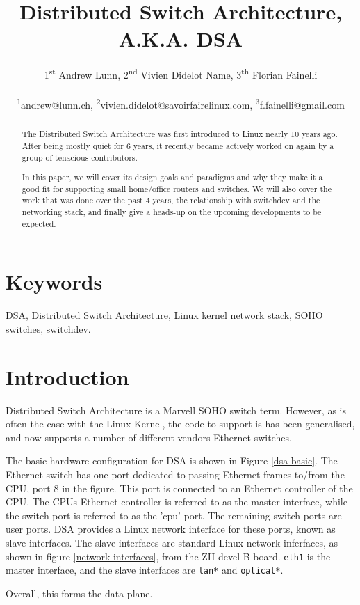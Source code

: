 \documentclass[letterpaper]{article}
\title{Distributed Switch Architecture,\\ A.K.A. DSA}
\author{1\textsuperscript{st} Andrew Lunn, 2\textsuperscript{nd} Vivien Didelot Name,  3\textsuperscript{th} Florian Fainelli\\
  \\
  \textsuperscript{1}andrew@lunn.ch,
  \textsuperscript{2}vivien.didelot@savoirfairelinux.com,
  \textsuperscript{3}f.fainelli@gmail.com\\
}
\begin{document}
\maketitle
\begin{abstract}

  The Distributed Switch Architecture was first introduced to Linux
  nearly 10 years ago. After being mostly quiet for 6 years, it
  recently became actively worked on again by a group of tenacious
  contributors.

  In this paper, we will cover its design goals and paradigms and why
  they make it a good fit for supporting small home/office routers and
  switches. We will also cover the work that was done over the past 4
  years, the relationship with switchdev and the networking stack, and
  finally give a heads-up on the upcoming developments to be expected.
\end{abstract}

\section{Keywords}

DSA, Distributed Switch Architecture, Linux kernel network stack, SOHO
switches, switchdev.

\section{Introduction}

Distributed Switch Architecture is a Marvell SOHO switch
term. However, as is often the case with the Linux Kernel, the code to
support is has been generalised, and now supports a number of
different vendors Ethernet switches.

The basic hardware configuration for DSA is shown in Figure
\ref{dsa-basic}. The Ethernet switch has one port dedicated to passing
Ethernet frames to/from the CPU, port 8 in the figure. This port is
connected to an Ethernet controller of the CPU. The CPUs Ethernet
controller is referred to as the master interface, while the switch
port is referred to as the 'cpu' port. The remaining switch ports are
user ports. DSA provides a Linux network interface for these ports,
known as slave interfaces. The slave interfaces are standard Linux
network inferfaces, as shown in figure \ref{network-interfaces}, from
the ZII devel B board. \verb|eth1| is the master interface, and the
slave interfaces are \verb|lan*| and \verb|optical*|.

Overall, this forms the data plane.
\end{document}
